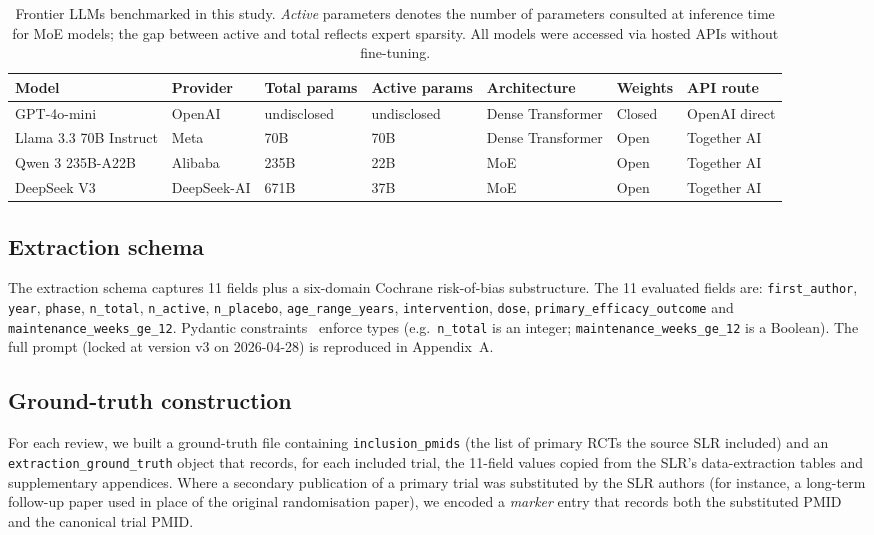 \documentclass[a4paper,fleqn]{cas-sc}
\begin{document}
\begin{table}[t]
\caption{Frontier LLMs benchmarked in this study. \textit{Active}
parameters denotes the number of parameters consulted at inference time
for MoE models; the gap between active and total reflects expert
sparsity. All models were accessed via hosted APIs without fine-tuning.}
\label{tbl:models}
\begin{tabular*}{\tblwidth}{@{}p{2.7cm}p{2.0cm}p{1.6cm}p{1.6cm}p{2.5cm}p{2.0cm}p{2.0cm}@{}}
\toprule
Model & Provider & Total params & Active params & Architecture & Weights & API route \\
\midrule
GPT-4o-mini       & OpenAI       & undisclosed & undisclosed & Dense Transformer & Closed & OpenAI direct \\
Llama 3.3 70B Instruct & Meta    & 70B  & 70B  & Dense Transformer & Open   & Together AI \\
Qwen 3 235B-A22B  & Alibaba      & 235B & 22B  & MoE   & Open   & Together AI \\
DeepSeek V3       & DeepSeek-AI  & 671B & 37B  & MoE   & Open   & Together AI \\
\bottomrule
\end{tabular*}
\end{table}

\subsection{Extraction schema}\label{sec:methods:schema}

The extraction schema captures 11 fields plus a six-domain Cochrane
risk-of-bias substructure. The 11 evaluated fields are:
\texttt{first\_author}, \texttt{year}, \texttt{phase}, \texttt{n\_total},
\texttt{n\_active}, \texttt{n\_placebo}, \texttt{age\_range\_years},
\texttt{intervention}, \texttt{dose}, \texttt{primary\_efficacy\_outcome}
and \texttt{maintenance\_weeks\_ge\_12}. Pydantic
constraints~\citep{pydantic2024} enforce types (e.g.\ \texttt{n\_total} is
an integer; \texttt{maintenance\_weeks\_ge\_12} is a Boolean).
The full prompt (locked at version v3 on 2026-04-28) is reproduced in
Appendix~A.

\subsection{Ground-truth construction}

For each review, we built a ground-truth file containing
\texttt{inclusion\_pmids} (the list of primary RCTs the source SLR
included) and an \texttt{extraction\_ground\_truth} object that records,
for each included trial, the 11-field values copied from the SLR's
data-extraction tables and supplementary appendices. Where a
secondary publication of a primary trial was substituted by the SLR
authors (for instance, a long-term follow-up paper used in place of the
original randomisation paper), we encoded a \emph{marker} entry that
records both the substituted PMID and the canonical trial PMID.
\end{document}

